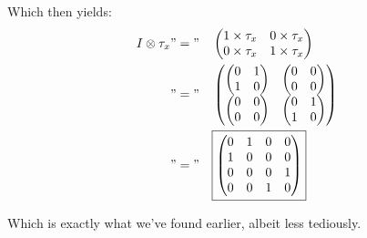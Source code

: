 \documentclass[solutions.tex]{subfiles}
\begin{document}
Which then yields:
\begin{equation*}\begin{aligned}
	I\otimes\tau_x &"="&& \begin{pmatrix}
		1\times\tau_x & 0\times\tau_x \\
		0\times\tau_x & 1\times\tau_x \\
	\end{pmatrix} \\
	~ &"="&& \begin{pmatrix}
		\begin{pmatrix}
			0 & 1 \\
			1 & 0 \\
		\end{pmatrix} & \begin{pmatrix}
			0 & 0 \\
			0 & 0 \\
		\end{pmatrix} \\
		\begin{pmatrix}
			0 & 0 \\
			0 & 0 \\
		\end{pmatrix} & \begin{pmatrix}
			0 & 1 \\
			1 & 0 \\
		\end{pmatrix} \\
	\end{pmatrix} \\
	~ &"="&& \boxed{\begin{pmatrix}
		0 & 1 & 0 & 0 \\
		1 & 0 & 0 & 0 \\
		0 & 0 & 0 & 1 \\
		0 & 0 & 1 & 0 \\
	\end{pmatrix}} \\
\end{aligned}\end{equation*}

Which is exactly what we've found earlier, albeit less tediously.

\hrr
\end{document}
